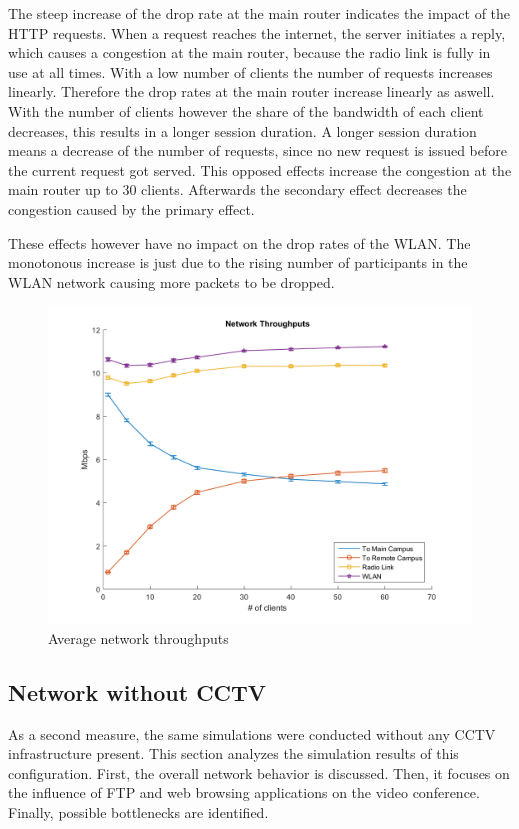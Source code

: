 \documentclass[
10pt, %
a4paper, %
oneside, %
headinclude,footinclude, %
BCOR5mm, %
]{scrartcl}
\begin{document}
The steep increase of the drop rate at the main router indicates the impact of the HTTP requests. When a request reaches the internet, the server initiates a reply, which causes a congestion at the main router, because the radio link is fully in use at all times. With a low number of clients the number of requests increases linearly. Therefore the drop rates at the main router increase linearly as aswell. With the number of clients however the share of the bandwidth of each client decreases, this results in a longer session duration. A longer session duration means a decrease of the number of requests, since no new request is issued before the current request got served. This opposed effects increase the congestion at the main router up to 30 clients. Afterwards the secondary effect decreases the congestion caused by the primary effect.

These effects however have no impact on the drop rates of the WLAN. The monotonous increase is just due to the rising number of participants in the WLAN network causing more packets to be dropped.

\begin{figure}[!ht]
  \centering
  \includegraphics[width=\textwidth]{Figures/nocctv/Network_Throughputs.png}
  \caption{Average network throughputs} \label{fig:net_throughput}
\end{figure}

\subsection{Network without CCTV}
As a second measure, the same simulations were conducted without any CCTV infrastructure present. This section analyzes the simulation results of this configuration. First, the overall network behavior is discussed. Then, it focuses on the influence of FTP and web browsing applications on the video conference. Finally, possible bottlenecks are identified.
\end{document}
